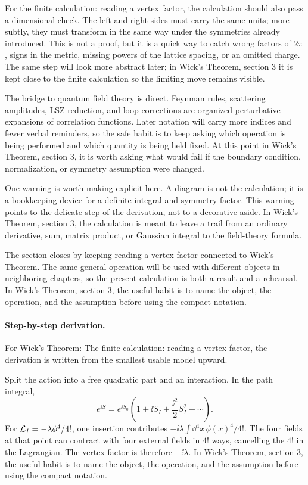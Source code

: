 For the finite calculation: reading a vertex factor, the calculation should also pass a dimensional check.  The left and right sides must carry the same units; more subtly, they must transform in the same way under the symmetries already introduced.  This is not a proof, but it is a quick way to catch wrong factors of \(2\pi\), signs in the metric, missing powers of the lattice spacing, or an omitted charge.  The same step will look more abstract later; in Wick's Theorem, section 3 it is kept close to the finite calculation so the limiting move remains visible.

The bridge to quantum field theory is direct.  Feynman rules, scattering amplitudes, LSZ reduction, and loop corrections are organized perturbative expansions of correlation functions.  Later notation will carry more indices and fewer verbal reminders, so the safe habit is to keep asking which operation is being performed and which quantity is being held fixed.  At this point in Wick's Theorem, section 3, it is worth asking what would fail if the boundary condition, normalization, or symmetry assumption were changed.

One warning is worth making explicit here.  A diagram is not the calculation; it is a bookkeeping device for a definite integral and symmetry factor.  This warning points to the delicate step of the derivation, not to a decorative aside.  In Wick's Theorem, section 3, the calculation is meant to leave a trail from an ordinary derivative, sum, matrix product, or Gaussian integral to the field-theory formula.

The section closes by keeping reading a vertex factor connected to Wick's Theorem.  The same general operation will be used with different objects in neighboring chapters, so the present calculation is both a result and a rehearsal.  In Wick's Theorem, section 3, the useful habit is to name the object, the operation, and the assumption before using the compact notation.



\paragraph{Step-by-step derivation.}

For Wick's Theorem: The finite calculation: reading a vertex factor, the derivation is written from the smallest usable model upward.

Split the action into a free quadratic part and an interaction.  In the path integral,
\[
  e^{\ii S}=e^{\ii S_0}\left(1+\ii S_I+\frac{\ii^2}{2}S_I^2+\cdots\right).
\]
For \(\mathcal L_I=-\lambda\phi^4/4!\), one insertion contributes \(-\ii\lambda\int\dd^4x\,\phi(x)^4/4!\).  The four fields at that point can contract with four external fields in \(4!\) ways, cancelling the \(4!\) in the Lagrangian.  The vertex factor is therefore \(-\ii\lambda\).  In Wick's Theorem, section 3, the useful habit is to name the object, the operation, and the assumption before using the compact notation.

